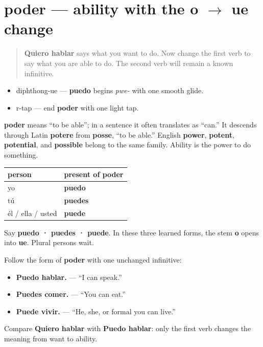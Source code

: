 \section[poder]{poder — ability with the o $\to$ ue change}

\label{lesson:ES-C11-poder}



\begin{quote}
\textbf{Quiero hablar} says what you want to do. Now change the first verb to say what you are able to do. The second verb will remain a known infinitive.
\end{quote}

\begin{sounds}
\begin{itemize}
\raggedright
  \item diphthong-ue — \textbf{puedo} begins \emph{pwe-} with one smooth glide.
  \item r-tap — end \textbf{poder} with one light tap.
\end{itemize}
\end{sounds}

\begin{cousinweb}
\textbf{poder} means “to be able”; in a sentence it often translates as “can.” It descends through Latin \textbf{potere} from \textbf{posse}, “to be able.” English \textbf{power}, \textbf{potent}, \textbf{potential}, and \textbf{possible} belong to the same family. Ability is the power to do something.
\end{cousinweb}

\begin{grammarlens}[title={Grammar Lens: the three singular forms}]
\noindent
\begin{tabularx}{\linewidth}{@{}>{\raggedright\arraybackslash}X>{\raggedright\arraybackslash}X@{}}
\toprule
\textbf{person} & \textbf{present of \textbf{poder}} \\
\midrule
yo & \textbf{puedo} \\
tú & \textbf{puedes} \\
él / ella / usted & \textbf{puede} \\
\bottomrule
\end{tabularx}

Say \textbf{puedo · puedes · puede}. In these three learned forms, the stem \textbf{o} opens into \textbf{ue}. Plural persons wait.

Follow the form of \textbf{poder} with one unchanged infinitive:

\begin{itemize}
\raggedright
  \item \textbf{Puedo hablar.} — “I can speak.”
  \item \textbf{Puedes comer.} — “You can eat.”
  \item \textbf{Puede vivir.} — “He, she, or formal you can live.”
\end{itemize}

Compare \textbf{Quiero hablar} with \textbf{Puedo hablar}: only the first verb changes the meaning from want to ability.
\end{grammarlens}

